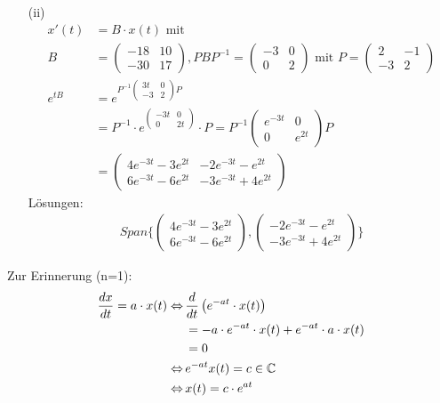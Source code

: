 \begin{itemize}
\item[(ii)]
\begin{align}
x'(t) &= B \cdot x(t) \text{ mit} \\
B &= \begin{pmatrix} -18 & 10 \\ -30 & 17 \end{pmatrix}, PBP^{-1} = \begin{pmatrix} -3 & 0 \\ 0 & 2 \end{pmatrix} \text{ mit } P = \begin{pmatrix} 2 & -1 \\ -3 & 2 \end{pmatrix}\\
e^{tB} &= e^{P^{-1} \begin{pmatrix} 3t & 0 \\ -3 & 2 \end{pmatrix} P} \\ &= P^{-1} \cdot e^{\begin{pmatrix} -3t & 0 \\ 0 & 2t \end{pmatrix}} \cdot P = P^{-1} \begin{pmatrix} e^{-3t} & 0 \\ 0 & e^{2t} \end{pmatrix} P \\
&= \begin{pmatrix} 4e^{-3t}-3e^{2t} & -2e^{-3t} - e^{2t} \\ 6e^{-3t} - 6e^{2t} & -3e^{-3t} + 4e^{2t} \end{pmatrix}
\end{align}
Lösungen:
\begin{align}
Span\{ \begin{pmatrix} 4e^{-3t} - 3e^{2t} \\ 6e^{-3t} -6e^{2t} \end{pmatrix}, \begin{pmatrix} -2e^{-3t} - e^{2t} \\ -3e^{-3t} + 4e^{2t} \end{pmatrix}\}
\end{align}
\end{itemize}
Zur Erinnerung (n=1):
\begin{align}
\frac{dx}{dt} = a \cdot x(t) \Leftrightarrow\, &\frac{d}{dt} \left( e^{-at} \cdot x(t) \right) \\
&= -a \cdot e^{-at} \cdot x(t) + e^{-at} \cdot a \cdot x(t) \\
&= 0 \\
\Leftrightarrow\, &e^{-at} x(t) = c \in \mathbb{C} \\
\Leftrightarrow\, &x(t) = c \cdot e^{at}
\end{align}

